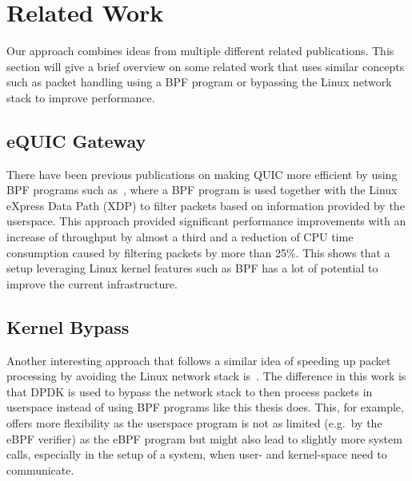 \section{Related Work}\label{sec:related_work}

Our approach combines ideas from multiple different 
related publications.
This section will give a brief overview on some related work 
that uses similar concepts such as packet handling using a BPF 
program or bypassing the Linux network stack to improve performance.

\subsection{eQUIC Gateway}
There have been previous publications on making QUIC more efficient by using BPF programs
such as~\parencite{equic-gateway}, where a BPF program is used together with the Linux
eXpress Data Path (XDP) to filter packets based on information provided by the userspace.
This approach provided significant performance improvements with an increase of throughput
by almost a third and a reduction of CPU time consumption caused by filtering packets by
more than 25\%.
This shows that a setup leveraging Linux kernel features such as BPF has a lot of potential
to improve the current infrastructure.

\subsection{Kernel Bypass}
Another interesting approach that follows a similar idea of speeding up packet processing
by avoiding the Linux network stack is~\parencite{kernel-bypass-msc-thesis}.
The difference in this work is that DPDK is used to bypass the network stack to 
then process packets in userspace instead of using BPF programs like this thesis does.
This, for example, offers more flexibility as the userspace program is not as limited (e.g.\ 
by the eBPF verifier) as the eBPF program but might also lead to slightly more system calls,
especially in the setup of a system, when user- and kernel-space need to communicate.

